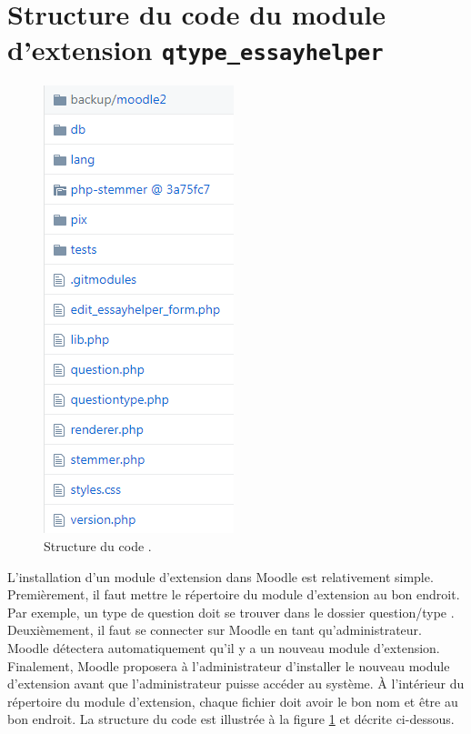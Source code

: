 \section{Structure du code du module d'extension \texttt{qtype\_essayhelper}}
\begin{figure}[htbp]
  \includegraphics[scale=0.7]{images/architecture.png}
  \caption{Structure du code .}
  \label{dev-architecture}
\end{figure}

L'installation d'un module d'extension dans Moodle est relativement simple.
Premi\`erement, il faut mettre le r\'epertoire du module d'extension au bon endroit.
Par exemple, un type de question doit se trouver dans le dossier \og question/type \fg{}.
Deuxi\`emement, il faut se connecter sur Moodle en tant qu'administrateur.
Moodle d\'etectera automatiquement qu'il y a un nouveau module d'extension.
Finalement, Moodle proposera \`a l'administrateur d'installer le nouveau module d'extension avant que l'administrateur puisse acc\'eder au syst\`eme.
\`A l'int\'erieur du r\'epertoire du module d'extension, chaque fichier doit avoir le bon nom et \^etre au bon endroit.
La structure du code est illustr\'ee \`a la figure \ref{dev-architecture} et d\'ecrite ci-dessous.
 
